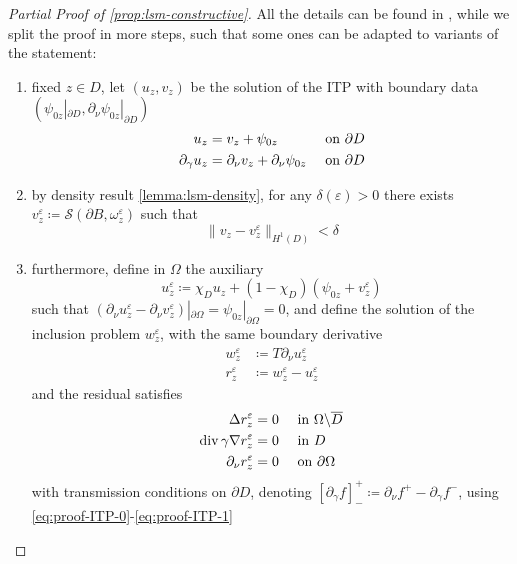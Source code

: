 \documentclass[10pt, a4paper, twoside, openright]{book}
\theoremstyle{definition}
\theoremstyle{plain}
\theoremstyle{plain}
\theoremstyle{plain}
\theoremstyle{plain}
\theoremstyle{plain}
\theoremstyle{plain}
\theoremstyle{plain}
\theoremstyle{plain}
\DeclareMathOperator{\divergence}{div}
\let\epsilon\varepsilon
\begin{document}
\begin{proof}
 [Partial Proof of \ref{prop:lsm-constructive}]
 All the details can be found in \cite{somersalo:preprint}, while we split the proof in more steps, such that some ones can be adapted to variants of the statement:
 \begin{enumerate}
  \item fixed $z\in D$, let $(u_z, v_z)$ be the solution of the ITP with boundary data $(\psi_{0z}|_{\partial D}, \partial_\nu\psi_{0z}|_{\partial D})$
  \begin{subequations}
  \begin{align}
   u_z &= v_z + \psi_{0z} &&\textup{ on }\partial D  \label{eq:proof-ITP-0} \\
   \partial_\gamma u_z &= \partial_\nu v_z + \partial_\nu \psi_{0z}   &&\textup{ on }\partial D \label{eq:proof-ITP-1}
  \end{align}
  \end{subequations}
  \item by density result \ref{lemma:lsm-density}, for any $\delta(\epsilon)>0$ there exists $v^\epsilon_z\coloneqq\mathcal{S}(\partial B, \omega^\epsilon_z)$ such that
  \begin{equation}
   \|v_z-v_z^\epsilon\|_{H^1(D)}<\delta
  \end{equation}
  \item furthermore, define in $\Omega$ the auxiliary 
  \begin{equation}
   u^\epsilon_z\coloneqq\chi_Du_z + (1-\chi_D)(\psi_{0z} + v^\epsilon_z) 
  \end{equation}
  such that $(\partial_\nu u^\epsilon_z -\partial_\nu v^\epsilon_z )|_{\partial\Omega}=\psi_{0z}|_{\partial\Omega}=0$, and define the solution of the inclusion problem $w^\epsilon_z$, with the same boundary derivative
  \begin{align}
   w^\epsilon_z&\coloneqq T\partial_\nu u^\epsilon_z \\
   r^\epsilon_z&\coloneqq w^\epsilon_z - u^\epsilon_z
  \end{align}
  and the residual satisfies 
  \begin{align}
  \Delta r^\epsilon_z & = 0 \quad \textup{ in }\Omega\backslash\overline{D} \\
  \divergence\gamma\nabla r^\epsilon_z &= 0  \quad \textup{ in }D \\
  \partial_\nu r^\epsilon_z &=0 \quad \textup{ on }\partial \Omega
  \end{align}
  with transmission conditions on $\partial D$, denoting $[\partial_\gamma f]^+_- \coloneqq \partial_\nu f^+ - \partial_\gamma f^-$, using \ref{eq:proof-ITP-0}-\ref{eq:proof-ITP-1}

\end{enumerate}
\end{proof}
\end{document}
